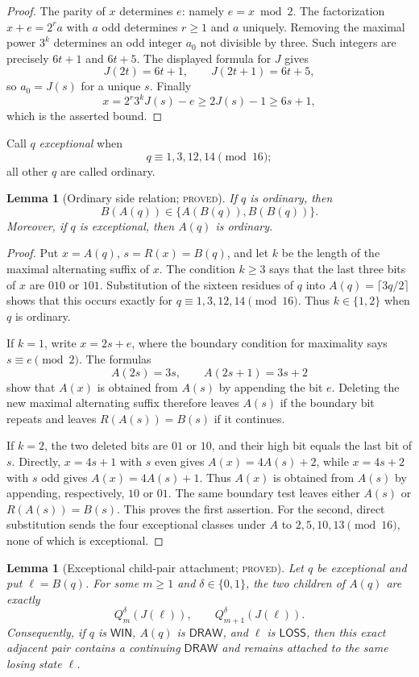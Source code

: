 \documentclass[11pt]{article}
\newtheorem{lemma}[theorem]{Lemma}
\theoremstyle{definition}
\newcommand{\Win}{\mathsf{WIN}}
\newcommand{\Loss}{\mathsf{LOSS}}
\newcommand{\Draw}{\mathsf{DRAW}}
\newcommand{\proved}{\textsc{proved}}
\begin{document}
\begin{proof}
The parity of $x$ determines $e$: namely $e=x\bmod2$.  The factorization
$x+e=2^r a$ with $a$ odd determines $r\ge1$ and $a$ uniquely.  Removing the
maximal power $3^k$ determines an odd integer $a_0$ not divisible by three.
Such integers are precisely $6t+1$ and $6t+5$.  The displayed formula for
$J$ gives
\[
 J(2t)=6t+1,\qquad J(2t+1)=6t+5,
\]
so $a_0=J(s)$ for a unique $s$.  Finally
\[
 x=2^r3^kJ(s)-e\ge2J(s)-1\ge6s+1,
\]
which is the asserted bound.
\end{proof}

Call $q$ \emph{exceptional} when
\[
 q\equiv1,3,12,14\pmod {16};
\]
all other $q$ are called ordinary.

\begin{lemma}[Ordinary side relation; \proved]
\label{lem:ordinary-side}
If $q$ is ordinary, then
\[
 B(A(q))\in\{A(B(q)),B(B(q))\}.
\]
Moreover, if $q$ is exceptional, then $A(q)$ is ordinary.
\end{lemma}

\begin{proof}
Put $x=A(q)$, $s=R(x)=B(q)$, and let $k$ be the length of the maximal
alternating suffix of $x$.  The condition $k\ge3$ says that the last three
bits of $x$ are $010$ or $101$.  Substitution of the sixteen residues of
$q$ into $A(q)=\lceil3q/2\rceil$ shows that this occurs exactly for
$q\equiv1,3,12,14\pmod {16}$.  Thus $k\in\{1,2\}$ when $q$ is ordinary.

If $k=1$, write $x=2s+e$, where the boundary condition for maximality says
$s\equiv e\pmod2$.  The formulas
\[
 A(2s)=3s,\qquad A(2s+1)=3s+2
\]
show that $A(x)$ is obtained from $A(s)$ by appending the bit $e$.
Deleting the new maximal alternating suffix therefore leaves $A(s)$ if the
boundary bit repeats and leaves $R(A(s))=B(s)$ if it continues.

If $k=2$, the two deleted bits are $01$ or $10$, and their high bit equals
the last bit of $s$.  Directly, $x=4s+1$ with $s$ even gives
$A(x)=4A(s)+2$, while $x=4s+2$ with $s$ odd gives
$A(x)=4A(s)+1$.  Thus $A(x)$ is obtained from $A(s)$ by appending,
respectively, $10$ or $01$.  The same boundary test leaves either $A(s)$
or $R(A(s))=B(s)$.  This proves the first assertion.  For the second,
direct substitution sends the four exceptional classes under $A$ to
$2,5,10,13\pmod {16}$, none of which is exceptional.
\end{proof}

\begin{lemma}[Exceptional child-pair attachment; \proved]
\label{lem:exceptional-pair}
Let $q$ be exceptional and put $\ell=B(q)$.  For some $m\ge1$ and
$\delta\in\{0,1\}$, the two children of $A(q)$ are exactly
\[
 Q_m^\delta(J(\ell)),\qquad Q_{m+1}^\delta(J(\ell)).
\]
Consequently, if $q$ is $\Win$, $A(q)$ is $\Draw$, and $\ell$ is $\Loss$,
then this exact adjacent pair contains a continuing $\Draw$ and remains
attached to the same losing state $\ell$.
\end{lemma}
\end{document}
